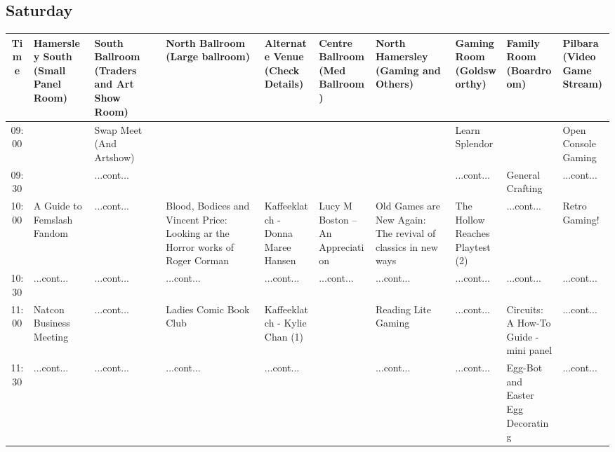 \documentclass{scrreprt}
\begin{document}
\begin{landscape}
\subsection*{Saturday}\tiny
\begin{tabular}{c||p{25mm}|p{25mm}|p{25mm}|p{25mm}|p{25mm}|p{25mm}|p{25mm}|p{25mm}|p{25mm}|}
Time&Hamersley South (Small Panel Room)&South Ballroom (Traders and Art Show Room)&North Ballroom (Large ballroom)&Alternate Venue (Check Details)&Centre Ballroom (Med Ballroom)&North Hamersley (Gaming and Others)&Gaming Room (Goldsworthy)&Family Room (Boardroom)&Pilbara (Video Game Stream)\\
\hline
\hline
09:00&&\cellcolor[gray]{0.638679} Swap Meet (And Artshow)&&&&&\cellcolor[gray]{0.548973} Learn Splendor&&\cellcolor[gray]{0.731777} Open Console Gaming\\
09:30&&\cellcolor[gray]{0.638679} ...cont...&&&&&\cellcolor[gray]{0.548973} ...cont...&\cellcolor[gray]{0.736632} General Crafting&\cellcolor[gray]{0.731777} ...cont...\\
10:00&\cellcolor[gray]{0.524500} A Guide to Femslash Fandom&\cellcolor[gray]{0.638679} ...cont...&\cellcolor[gray]{0.851782} Blood, Bodices and Vincent Price: Looking ar the Horror works of Roger Corman&\cellcolor[gray]{0.852232} Kaffeeklatch - Donna Maree Hansen&\cellcolor[gray]{0.938353} Lucy M Boston – An Appreciation&\cellcolor[gray]{0.802938} Old Games are New Again: The revival of classics in new ways&\cellcolor[gray]{0.960488} The Hollow Reaches Playtest (2)&\cellcolor[gray]{0.736632} ...cont...&\cellcolor[gray]{0.711113} Retro Gaming!\\
10:30&\cellcolor[gray]{0.524500} ...cont...&\cellcolor[gray]{0.638679} ...cont...&\cellcolor[gray]{0.851782} ...cont...&\cellcolor[gray]{0.852232} ...cont...&\cellcolor[gray]{0.938353} ...cont...&\cellcolor[gray]{0.802938} ...cont...&\cellcolor[gray]{0.960488} ...cont...&\cellcolor[gray]{0.736632} ...cont...&\cellcolor[gray]{0.711113} ...cont...\\
11:00&\cellcolor[gray]{0.655694} Natcon Business Meeting&\cellcolor[gray]{0.638679} ...cont...&\cellcolor[gray]{0.680885} Ladies Comic Book Club&\cellcolor[gray]{0.838072} Kaffeeklatch - Kylie Chan (1)&&\cellcolor[gray]{0.915260} Reading Lite Gaming&\cellcolor[gray]{0.960488} ...cont...&\cellcolor[gray]{0.935889} Circuits: A How-To Guide - mini panel&\cellcolor[gray]{0.711113} ...cont...\\
11:30&\cellcolor[gray]{0.655694} ...cont...&\cellcolor[gray]{0.638679} ...cont...&\cellcolor[gray]{0.680885} ...cont...&\cellcolor[gray]{0.838072} ...cont...&&\cellcolor[gray]{0.915260} ...cont...&\cellcolor[gray]{0.960488} ...cont...&\cellcolor[gray]{0.757182} Egg-Bot and Easter Egg Decorating&\cellcolor[gray]{0.711113} ...cont...\\

\end{tabular}
\end{landscape}
\end{document}
